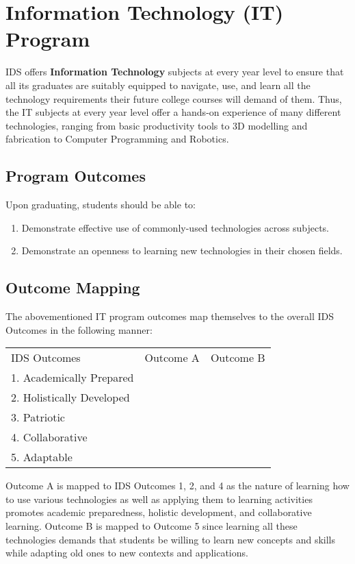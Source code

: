 \section{Information Technology (IT) Program}
IDS offers \textbf{Information Technology} subjects at every year level to ensure that all its graduates are suitably equipped to navigate, use, and learn all the technology requirements their future college courses will demand of them. Thus, the IT subjects at every year level offer a hands-on experience of many different technologies, ranging from basic productivity tools to 3D modelling and fabrication to Computer Programming and Robotics.

\subsection{Program Outcomes}
Upon graduating, students should be able to:
\begin{enumerate}[label=\Alph*.]
	\item{Demonstrate effective use of commonly-used technologies across subjects.}
	\item{Demonstrate an openness to learning new technologies in their chosen fields.}
\end{enumerate}

\subsection{Outcome Mapping}
The abovementioned IT program outcomes map themselves to the overall IDS Outcomes in the following manner:
\begin{center}
\begin{tabular}{ l | c | c }
	IDS Outcomes				& Outcome A 	& Outcome B 	\\
	1. Academically Prepared	& \checkmark	&				\\
	2. Holistically Developed	& \checkmark	&				\\
	3. Patriotic 				& 				&				\\
	4. Collaborative			& \checkmark	&				\\
	5. Adaptable				&				& \checkmark	\\
\end{tabular}
\end{center}

Outcome A is mapped to IDS Outcomes 1, 2, and 4 as the nature of learning how to use various technologies as well as applying them to learning activities promotes academic preparedness, holistic development, and collaborative learning. Outcome B is mapped to Outcome 5 since learning all these technologies demands that students be willing to learn new concepts and skills while adapting old ones to new contexts and applications.

